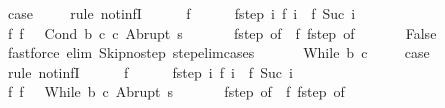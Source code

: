 \begin{isabellebody}
\ {\isacharquery}case\ \isanewline
\ \ \isamarkupfalse%
\ {\isacharparenleft}rule\ not{\isacharunderscore}infI{\isacharparenright}\isanewline
\ \ \ \ \isamarkupfalse%
\ f\isanewline
\ \ \ \ \isamarkupfalse%
\ f{\isacharunderscore}step{\isacharcolon}\ {\isachardoublequoteopen}{\isasymAnd}i{\isachardot}\ {\isasymGamma}{\isasymturnstile}f\ i\ {\isasymrightarrow}\ f\ {\isacharparenleft}Suc\ i{\isacharparenright}{\isachardoublequoteclose}\isanewline
\ \ \ \ \isamarkupfalse%
\ f{\isacharunderscore}{}{\isacharcolon}\ {\isachardoublequoteopen}f\ {}\ {\isacharequal}\ {\isacharparenleft}Cond\ b\ c\ c\ Abrupt\ s{\isacharparenright}{\isachardoublequoteclose}\ \isanewline
\ \ \ \ \isamarkupfalse%
\ f{\isacharunderscore}step\ {\isacharbrackleft}of\ {}{\isacharbrackright}\ f{\isacharunderscore}{}\ f{\isacharunderscore}step\ {\isacharbrackleft}of\ {}{\isacharbrackright}\isanewline
\ \ \ \ \isamarkupfalse%
\ False\isanewline
\ \ \ \ \ \ \isamarkupfalse%
\ {\isacharparenleft}fastforce\ elim{\isacharcolon}\ Skip{\isacharunderscore}no{\isacharunderscore}step\ step{\isacharunderscore}elim{\isacharunderscore}cases{\isacharparenright}\isanewline
\ \ \isamarkupfalse%
\isanewline
{}\isamarkupfalse%
\isanewline
\ \ \isamarkupfalse%
\ {\isacharparenleft}While\ b\ c{\isacharparenright}\ \isanewline
\ \ \isamarkupfalse%
\ {\isacharquery}case\ \isanewline
\ \ \isamarkupfalse%
\ {\isacharparenleft}rule\ not{\isacharunderscore}infI{\isacharparenright}\isanewline
\ \ \ \ \isamarkupfalse%
\ f\isanewline
\ \ \ \ \isamarkupfalse%
\ f{\isacharunderscore}step{\isacharcolon}\ {\isachardoublequoteopen}{\isasymAnd}i{\isachardot}\ {\isasymGamma}{\isasymturnstile}f\ i\ {\isasymrightarrow}\ f\ {\isacharparenleft}Suc\ i{\isacharparenright}{\isachardoublequoteclose}\isanewline
\ \ \ \ \isamarkupfalse%
\ f{\isacharunderscore}{}{\isacharcolon}\ {\isachardoublequoteopen}f\ {}\ {\isacharequal}\ {\isacharparenleft}While\ b\ c{\isacharcomma}\ Abrupt\ s{\isacharparenright}{\isachardoublequoteclose}\ \isanewline
\ \ \ \ \isamarkupfalse%
\ f{\isacharunderscore}step\ {\isacharbrackleft}of\ {}{\isacharbrackright}\ f{\isacharunderscore}{}\ f{\isacharunderscore}step\ {\isacharbrackleft}of\ {}{\isacharbrackright}\isanewline

\end{isabellebody}
